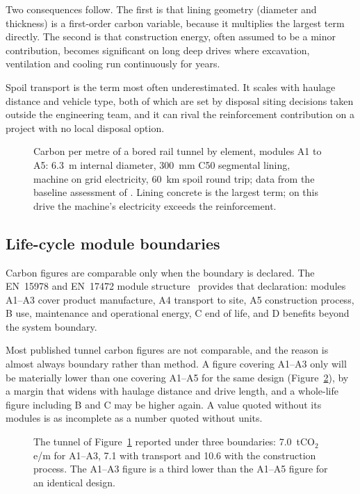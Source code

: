 Two consequences follow. The first is that lining geometry (diameter and
thickness) is a first-order carbon variable, because it multiplies the
largest term directly. The second is that construction energy, often assumed
to be a minor contribution, becomes significant on long deep drives where
excavation, ventilation and cooling run continuously for years.

Spoil transport is the term most often underestimated. It scales with haulage
distance and vehicle type, both of which are set by disposal siting decisions
taken outside the engineering team, and it can rival the reinforcement
contribution on a project with no local disposal option.

\begin{figure}[htbp]
\centering
{}
\caption{Carbon per metre of a bored rail tunnel by element, modules A1 to A5:
6.3~m internal diameter, 300~mm C50 segmental lining, machine on grid
electricity, 60~km spoil round trip; data from the baseline assessment of
\citet{chen2024carbonbaseline}. Lining concrete is the largest term; on this
drive the machine's electricity exceeds the reinforcement.}
\label{fig:sus-carbon-elements}
\end{figure}

\subsection{Life-cycle module boundaries}
\label{sec:carbon-modules}

Carbon figures are comparable only when the boundary is declared. The
EN~15978 and EN~17472 module structure~\citep{en15978,en17472} provides that declaration: modules
A1--A3 cover product manufacture, A4 transport to site, A5 construction
process, B use, maintenance and operational energy, C end of life, and D benefits beyond the
system boundary.

Most published tunnel carbon figures are not comparable, and the reason is
almost always boundary rather than method. A figure covering A1--A3 only will
be materially lower than one covering A1--A5 for the same design
(Figure~\ref{fig:sus-carbon-boundary}), by a margin
that widens with haulage distance and drive length, and a
whole-life figure including B and C may be higher again. A value quoted
without its modules is as incomplete as a number quoted without units.

\begin{figure}[htbp]
\centering
{}
\caption{The tunnel of Figure~\ref{fig:sus-carbon-elements} reported under
three boundaries: 7.0~tCO$_2$e/m for A1--A3, 7.1 with transport and 10.6 with
the construction process. The A1--A3 figure is a third lower than the A1--A5
figure for an identical design.}
\label{fig:sus-carbon-boundary}
\end{figure}

